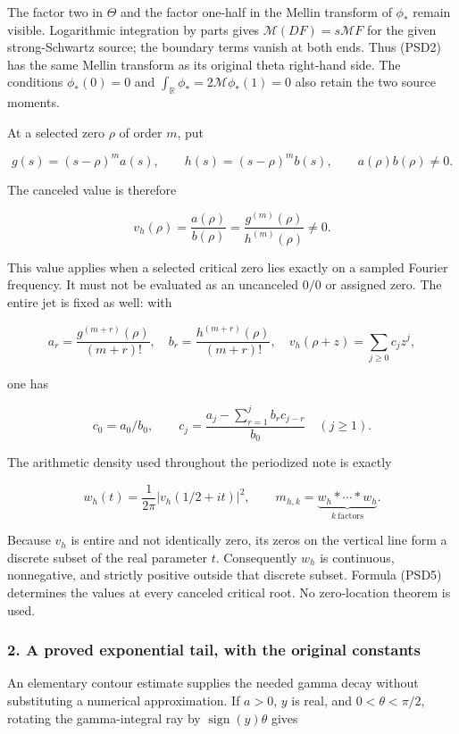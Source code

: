 The factor two in \(\Theta\) and the factor one-half in the Mellin transform of \(\phi_*\) remain visible. Logarithmic integration by parts gives \(\mathcal M(DF)=s\mathcal MF\) for the given strong-Schwartz source; the boundary terms vanish at both ends. Thus (PSD2) has the same Mellin transform as its original theta right-hand side. The conditions \(\phi_*(0)=0\) and \(\int_{\mathbb R}\phi_*=2\mathcal M\phi_*(1)=0\) also retain the two source moments.

At a selected zero \(\rho\) of order \(m\), put

\[
g(s)=(s-\rho)^m a(s),\qquad h(s)=(s-\rho)^m b(s),
\qquad a(\rho)b(\rho)\ne0.
\]

The canceled value is therefore

\[
v_h(\rho)=\frac{a(\rho)}{b(\rho)}
=\frac{g^{(m)}(\rho)}{h^{(m)}(\rho)}\ne0.
\tag{PSD5}
\]

This value applies when a selected critical zero lies exactly on a sampled Fourier frequency. It must not be evaluated as an uncanceled \(0/0\) or assigned zero. The entire jet is fixed as well: with

\[
a_r=\frac{g^{(m+r)}(\rho)}{(m+r)!},\quad
b_r=\frac{h^{(m+r)}(\rho)}{(m+r)!},\quad
v_h(\rho+z)=\sum_{j\ge0}c_jz^j,
\]

one has

\[
c_0=a_0/b_0,\qquad
c_j=\frac{a_j-\sum_{r=1}^j b_r c_{j-r}}{b_0}\quad(j\ge1).
\tag{PSD6}
\]

The arithmetic density used throughout the periodized note is exactly

\[
w_h(t)=\frac1{2\pi}\left|v_h(1/2+it)\right|^2,
\qquad m_{h,k}=\underbrace{w_h*\cdots*w_h}_{k\ \mathrm{factors}}.
\tag{PSD7}
\]

Because \(v_h\) is entire and not identically zero, its zeros on the vertical line form a discrete subset of the real parameter \(t\). Consequently \(w_h\) is continuous, nonnegative, and strictly positive outside that discrete subset. Formula (PSD5) determines the values at every canceled critical root. No zero-location theorem is used.

\subsubsection{2. A proved exponential tail, with the original constants}\label{a-proved-exponential-tail-with-the-original-constants}

An elementary contour estimate supplies the needed gamma decay without substituting a numerical approximation. If \(a>0\), \(y\) is real, and \(0<\theta<\pi/2\), rotating the gamma-integral ray by \(\operatorname{sign}(y) \theta\) gives

